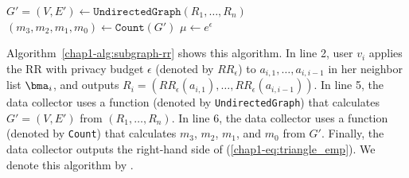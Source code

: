 \begin{algorithm}
  \SetAlgoLined
  $G'=(V,E') \leftarrow \texttt{UndirectedGraph}(R_1, \ldots, R_n)$\;
  $(m_3, m_2, m_1, m_0) \leftarrow \texttt{Count}(G')$\;
  $\mu \leftarrow e^\epsilon$\;

  \caption{\label{chap1-alg:subgraph-rr}}
\end{algorithm}

Algorithm~\ref{chap1-alg:subgraph-rr} shows this algorithm. 
In line 2, user $v_i$ applies the RR with privacy budget $\epsilon$ (denoted by $RR_\epsilon$) to $a_{i,1}, \ldots, a_{i,i-1}$ 
in her neighbor list $\bma_i$, and outputs $R_i = (RR_\epsilon(a_{i,1}), \ldots, RR_\epsilon(a_{i,i-1}))$. 
In line 5, the data collector uses a function (denoted by \texttt{UndirectedGraph}) that calculates $G'=(V,E')$ from $(R_1, \ldots, R_n)$. 
In line 6, the data collector uses a function (denoted by 
\texttt{Count}) that calculates $m_3$, $m_2$, $m_1$, and $m_0$ from $G'$. 
Finally, the data collector outputs the right-hand side of (\ref{chap1-eq:triangle_emp}). 
We denote this algorithm by .



